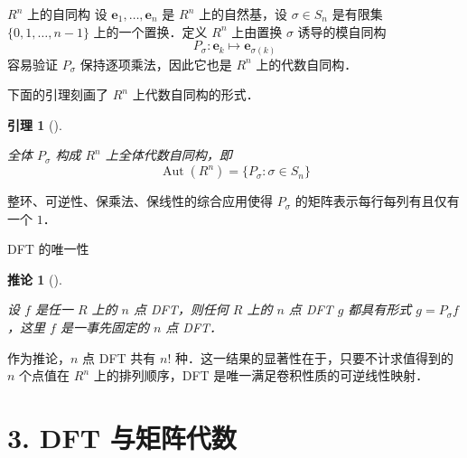\documentclass[
  ignorenonframetext,
  chinese-hans,
]{beamer}
\theoremstyle{plain}
\theoremstyle{plain}
\newtheorem{lemma}{引理}[section]
\theoremstyle{plain}
\theoremstyle{plain}
\newtheorem{corollary}{推论}[section]
\theoremstyle{remark}
\begin{document}
\begin{frame}{\(R^n\) 上的自同构}
\label{rn-ux4e0aux7684ux81eaux540cux6784}
设 \(\boldsymbol e_1,\dots,\boldsymbol e_n\) 是 \(R^n\) 上的自然基，设
\(\sigma \in S_n\) 是有限集 \(\{0,1,\dots,n-1 \}\) 上的一个置换．定义
\(R^n\) 上由置换 \(\sigma\) 诱导的模自同构 \[
P_\sigma: \boldsymbol e_k \mapsto \boldsymbol e_{\sigma(k)}
\] 容易验证 \(P_\sigma\) 保持逐项乘法，因此它也是 \(R^n\)
上的代数自同构．

下面的引理刻画了 \(R^n\) 上代数自同构的形式．

\begin{lemma}[]\protect\hypertarget{lem-perm}{}\label{lem-perm}

全体 \(P_\sigma\) 构成 \(R^n\) 上全体代数自同构，即 \[
\operatorname{Aut}(R^n) = \{ P_\sigma : \sigma \in S_n \}
\]

\end{lemma}

整环、可逆性、保乘法、保线性的综合应用使得 \(P_\sigma\)
的矩阵表示每行每列有且仅有一个 \(1\)．
\end{frame}

\begin{frame}{DFT 的唯一性}
\label{dft-ux7684ux552fux4e00ux6027}
\begin{corollary}[]\protect\hypertarget{cor-dft-unique}{}\label{cor-dft-unique}

设 \(f\) 是任一 \(R\) 上的 \(n\) 点 DFT，则任何 \(R\) 上的 \(n\) 点 DFT
\(g\) 都具有形式 \(g = P_\sigma f\)，这里 \(f\) 是一事先固定的 \(n\) 点
DFT．

\end{corollary}

作为推论，\(n\) 点 DFT 共有 \(n!\)
种．这一结果的显著性在于，只要不计求值得到的 \(n\) 个点值在 \(R^n\)
上的排列顺序，DFT 是唯一满足卷积性质的可逆线性映射．
\end{frame}

\section{3. DFT 与矩阵代数}\label{dft-ux4e0eux77e9ux9635ux4ee3ux6570}
\end{document}
